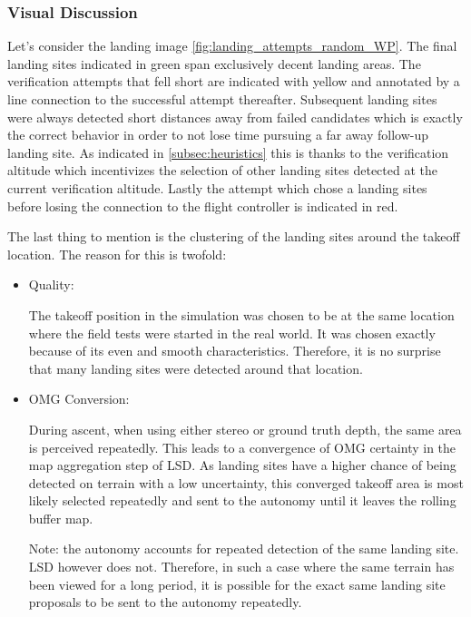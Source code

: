     \subsubsection{Visual Discussion}
    Let's consider the landing image \ref{fig:landing_attempts_random_WP}. The final landing sites indicated in green span exclusively decent landing areas. The verification attempts that fell short are indicated with yellow and annotated by a line connection to the successful attempt thereafter. Subsequent landing sites were always detected short distances away from failed candidates which is exactly the correct behavior in order to not lose time pursuing a far away follow-up landing site. As indicated in \cref{subsec:heuristics} this is thanks to the verification altitude which incentivizes the selection of other landing sites detected at the current verification altitude. Lastly the attempt which chose a landing sites before losing the connection to the flight controller is indicated in red. 
    

    The last thing to mention is the clustering of the landing sites around the takeoff location. The reason for this is twofold:
    \begin{itemize}
        \item Quality: 
        
        The takeoff position in the simulation was chosen to be at the same location where the field tests were started in the real world. It was chosen exactly because of its even and smooth characteristics. Therefore, it is no surprise that many landing sites were detected around that location. 
        \item OMG Conversion: 
        
        During ascent, when using either stereo or ground truth depth, the same area is perceived repeatedly. This leads to a convergence of OMG certainty in the map aggregation step of LSD. As landing sites have a higher chance of being detected on terrain with a low uncertainty, this converged takeoff area is most likely selected repeatedly and sent to the autonomy until it leaves the rolling buffer map. 
        
        Note: the autonomy accounts for repeated detection of the same landing site. LSD however does not. Therefore, in such a case where the same terrain has been viewed for a long period, it is possible for the exact same landing site proposals to be sent to the autonomy repeatedly.
    \end{itemize}

